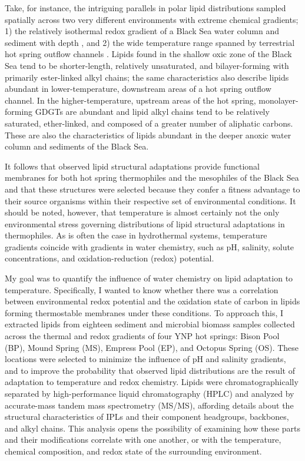 Take, for instance, the intriguing parallels in polar lipid distributions sampled spatially across two very different environments with extreme chemical gradients; 1) the relatively isothermal redox gradient of a Black Sea water column and sediment with depth \citep{schubotz2009detection, schroder2015intact}, and 2) the wide temperature range spanned by terrestrial hot spring outflow channels \citep{schubotz2013spatial, schubotz2015stable}. Lipids found in the shallow oxic zone of the Black Sea tend to be shorter-length, relatively unsaturated, and bilayer-forming with primarily ester-linked alkyl chains; the same characteristics also describe lipids abundant in lower-temperature, downstream areas of a hot spring outflow channel. In the higher-temperature, upstream areas of the hot spring, monolayer-forming GDGTs are abundant and lipid alkyl chains tend to be relatively saturated, ether-linked, and composed of a greater number of aliphatic carbons. These are also the characteristics of lipids abundant in the deeper anoxic water column and sediments of the Black Sea. 

It follows that observed lipid structural adaptations provide functional membranes for both hot spring thermophiles and the mesophiles of the Black Sea and that these structures were selected because they confer a fitness advantage to their source organisms within their respective set of environmental conditions. It should be noted, however, that temperature is almost certainly not the only environmental stress governing distributions of lipid structural adaptations in thermophiles. As is often the case in hydrothermal systems, temperature gradients coincide with gradients in water chemistry, such as pH, salinity, solute concentrations, and oxidation-reduction (redox) potential.

My goal was to quantify the influence of water chemistry on lipid adaptation to temperature. Specifically, I wanted to know whether there was a correlation between environmental redox potential and the oxidation state of carbon in lipids forming thermostable membranes under these conditions. To approach this, I extracted lipids from eighteen sediment and microbial biomass samples collected across the thermal and redox gradients of four YNP hot springs: Bison Pool (BP), Mound Spring (MS), Empress Pool (EP), and Octopus Spring (OS). These locations were selected to minimize the influence of pH and salinity gradients, and to improve the probability that observed lipid distributions are the result of adaptation to temperature and redox chemistry. Lipids were chromatographically separated by high-performance liquid chromatography (HPLC) and analyzed by accurate-mass tandem mass spectrometry (MS/MS), affording details about the structural characteristics of IPLs and their component headgroups, backbones, and alkyl chains. This analysis opens the possibility of examining how these parts and their modifications correlate with one another, or with the temperature, chemical composition, and redox state of the surrounding environment.

